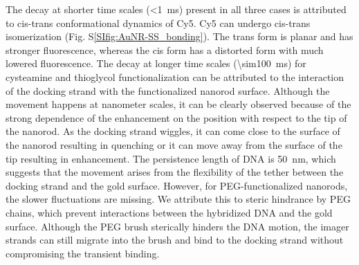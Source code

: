 The decay at shorter time scales (\SI{<1}{\ms}) present in all three cases is attributed to cis-trans conformational dynamics of Cy5.\cite{yeh2008tunable}
Cy5 can undergo cis-trans isomerization (Fig. S\ref{SIfig:AuNR-SS_bonding}). The trans form is planar and has stronger fluorescence, whereas the cis form has a distorted form with much lowered fluorescence.
The decay at longer time scales (\SI{\sim100}{\ms}) for cysteamine and thioglycol functionalization can be attributed to the interaction of the docking strand with the functionalized nanorod surface.
Although the movement happens at nanometer scales, it can be clearly observed because of the strong dependence of the enhancement on the position with respect to the tip of the nanorod.
As the docking strand wiggles, it can come close to the surface of the nanorod resulting in quenching or it can move away from the surface of the tip resulting in enhancement.
The persistence length of DNA\cite{manning2006the} is \SI{50}{\nm}, which suggests that the movement arises from the flexibility of the tether between the docking strand and the gold surface.
However, for PEG-functionalized nanorods, the slower fluctuations are missing. We attribute this to steric hindrance by PEG chains, which prevent interactions between the hybridized DNA and the gold surface. Although the PEG brush sterically hinders the DNA motion, the imager strands can still migrate into the brush and bind to the docking strand without compromising the transient binding.


